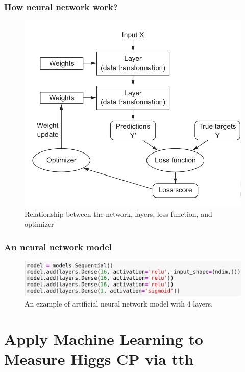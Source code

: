 \documentclass{beamer}
\begin{document}
\begin{frame}
\frametitle{How neural network work?}
\begin{figure}
\includegraphics[scale=0.25]{./figures/interaction.png}
\caption{Relationship between the network, layers, loss function, and optimizer}
\end{figure}
\end{frame}

\begin{frame}
\frametitle{An neural network model}
\begin{figure}
\includegraphics[scale=0.25]{./figures/model.png}
\caption{An example of artificial neural network model with 4 layers.}
\end{figure}
\end{frame}


\section{Apply Machine Learning to Measure Higgs CP via tth}
\end{document}
